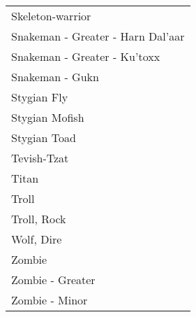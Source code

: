 \documentclass[twoside]{book}
\begin{document}
\begin{longtable}{p{1.25in}}
  \raggedright
           Skeleton-warrior 
  \tabularnewline
      
  \raggedright
           Snakeman - Greater - Harn
           Dal'aar 
  \tabularnewline
      
  \raggedright
           Snakeman - Greater -
           Ku'toxx 
  \tabularnewline
      
  \raggedright
           Snakeman - Gukn 
  \tabularnewline
      
  \raggedright
           Stygian Fly 
  \tabularnewline
      
  \raggedright
           Stygian Mofish 
  \tabularnewline
      
  \raggedright
           Stygian Toad 
  \tabularnewline
      
  \raggedright
           Tevish-Tzat 
  \tabularnewline
      
  \raggedright
           Titan 
  \tabularnewline
      
  \raggedright
           Troll 
  \tabularnewline
      
  \raggedright
           Troll, Rock 
  \tabularnewline
      
  \raggedright
           Wolf, Dire 
  \tabularnewline
      
  \raggedright
           Zombie 
  \tabularnewline
      
  \raggedright
           Zombie - Greater 
  \tabularnewline
      
  \raggedright
           Zombie - Minor 
  \tabularnewline
      
\end{longtable}
    
\end{document}
